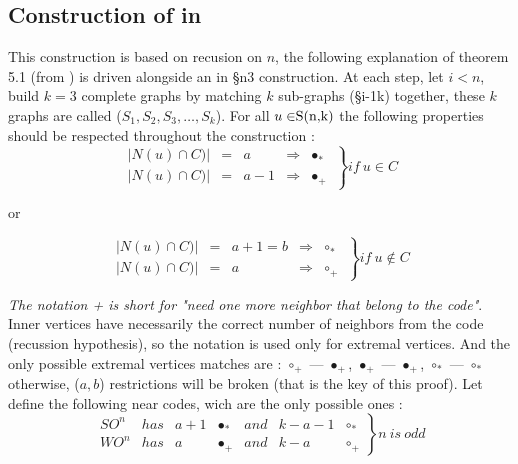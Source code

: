 \documentclass[10pt,a4paper,notitlepage]{article}
\begin{document}
\subsection{Construction of  in \Snk}\label{sec:construct}

This construction is based on recusion on $n$, the following explanation of theorem 5.1 (from \cite{Art}) is driven alongside an  in \S{n}{3} construction.
At each step, let $i < n$, build $k=3$ complete graphs by matching $k$ sub-graphs (\S{i-1}{k}) together, these $k$ graphs are called ($S_{1},S_{2},S_{3}, \ldots, S_{k}$).
For all $u \in \Snk$ the following properties should be respected throughout the construction :
\[\left.\begin{matrix}
    | N(u) \cap  C ) | & = & a & \Rightarrow &\bullet_{*}~
\\  | N(u) \cap  C ) | & = & a -1 & \Rightarrow &\bullet_{+}~
\end{matrix}\right\}if ~ u \in C\]
\begin{center}
or 
\end{center}
\[\left.\begin{matrix}
    | N(u) \cap  C ) | & = & a + 1 = b & \Rightarrow &\circ_{*}~
\\  | N(u) \cap  C ) | & = & a & \Rightarrow &\circ_{+}~
\end{matrix}\right\}if ~ u \notin C\]

\textit{The notation + is  short for "need one more neighbor that belong to the code"}. 
Inner vertices have necessarily the correct number of neighbors from the code (recussion hypothesis), so the notation is used only for extremal vertices. And the only possible extremal vertices matches are :  $\circ_{+}$ --- $\bullet_{+}$, $\bullet_{+}$ --- $\bullet_{+}$, $\circ_{*}$ --- $\circ_{*}$ otherwise, ($a,b$) restrictions will be broken (that is the key of this proof).
Let define the following near codes, wich are the only possible ones :
%
\[\left.\begin{matrix}
    SO^{n} & has & a+1 & \bullet_{*} & and & k-a-1 & \circ_{*} \\
    WO^{n} & has & a & \bullet_{+} & and & k-a & \circ_{+}
\end{matrix}\right\}n ~ is ~ odd\]
\end{document}

